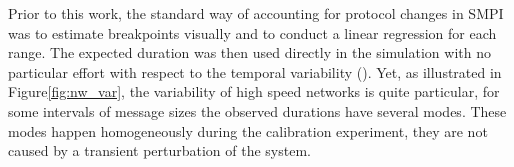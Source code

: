 
            Prior to this work, the standard way of accounting for protocol changes in SMPI was to estimate breakpoints
            visually and to conduct a linear regression for each range. The expected duration was then used directly in
            the simulation with no particular effort with respect to the temporal variability ().
            Yet, as illustrated in Figure\ref{fig:nw_var}, the variability of high speed networks is quite particular,
            for some intervals of message sizes the observed durations have several modes. These modes happen
            homogeneously during the calibration experiment, they are not caused by a transient perturbation of the
            system.

